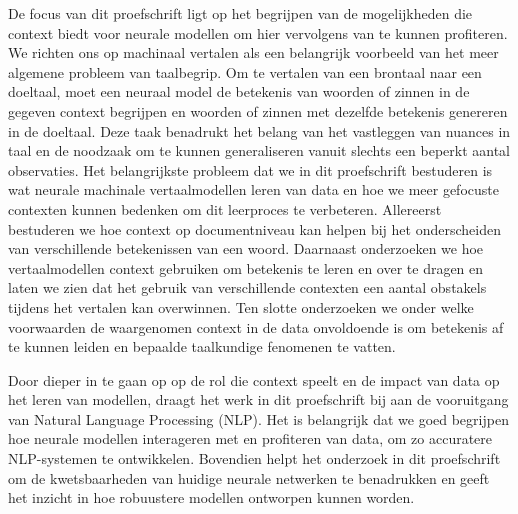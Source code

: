De focus van dit proefschrift ligt op het begrijpen van de mogelijkheden die context biedt voor neurale modellen om hier vervolgens van te kunnen profiteren.
We richten ons op machinaal vertalen als een belangrijk voorbeeld van het meer algemene probleem van taalbegrip.
Om te vertalen van een brontaal naar een doeltaal, moet een neuraal model de betekenis van woorden of zinnen in de gegeven context begrijpen en woorden of zinnen met dezelfde betekenis genereren in de doeltaal.
Deze taak benadrukt het belang van het vastleggen van nuances in taal en de noodzaak om te kunnen generaliseren vanuit slechts een beperkt aantal observaties.
%
Het belangrijkste probleem dat we in dit proefschrift bestuderen is wat neurale machinale vertaalmodellen leren van data en hoe we meer gefocuste contexten kunnen bedenken om dit leerproces te verbeteren.
Allereerst bestuderen we hoe context op documentniveau kan helpen bij het onderscheiden van verschillende betekenissen van een woord.
Daarnaast onderzoeken we hoe vertaalmodellen context gebruiken om betekenis te leren en over te dragen en laten we zien dat het gebruik van verschillende contexten een aantal obstakels tijdens het vertalen kan overwinnen.
Ten slotte onderzoeken we onder welke voorwaarden de waargenomen context in de data onvoldoende is om betekenis af te kunnen leiden en bepaalde taalkundige fenomenen te vatten.


Door dieper in te gaan op op de rol die context speelt en de impact van data op het leren van modellen, draagt het werk in dit proefschrift bij aan de vooruitgang van Natural Language Processing (NLP).
Het is belangrijk dat we goed begrijpen hoe neurale modellen interageren met en profiteren van data, om zo accuratere NLP-systemen te ontwikkelen.
Bovendien helpt het onderzoek in dit proefschrift om de kwetsbaarheden van huidige neurale netwerken te benadrukken en geeft het inzicht in hoe robuustere modellen ontworpen kunnen worden.

